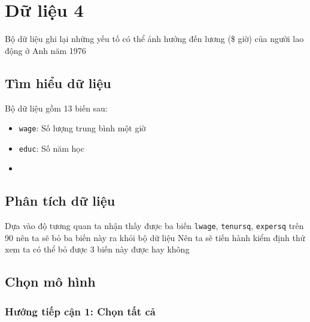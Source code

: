 
\section{Dữ liệu 4}
Bộ dữ liệu ghi lại những yếu tố có thể ảnh hưởng đến lương (\$ giờ) của người lao động ở Anh năm 1976

\subsection*{Tìm hiểu dữ liệu}
Bộ dữ liệu gồm 13 biến sau:
\begin{itemize}
	\item \texttt{wage}: Số lượng trung bình một giờ
	\item \texttt{educ}: Số năm học
	\item 
\end{itemize}

\subsection*{Phân tích dữ liệu}

Dựa vào độ tương quan ta nhận thấy được ba biến \texttt{lwage}, \texttt{tenursq}, \texttt{expersq} trên 90 nên ta sẽ bỏ ba biến này ra khỏi bộ dữ liệu
Nên ta sẽ tiến hành kiểm định thử xem ta có thể bỏ được 3 biến này được hay không

\subsection*{Chọn mô hình}
\subsubsection*{Hướng tiếp cận 1: Chọn tất cả}

